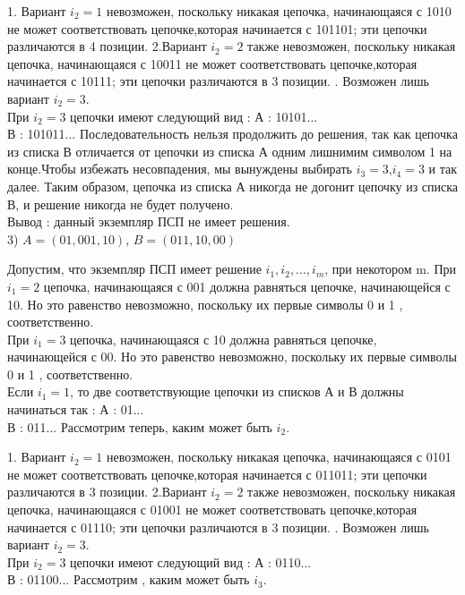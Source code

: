 \documentclass[12pt,a4paper]{article}
\begin{document}
\begin{enumerate}
	1. Вариант $i_2 = 1$ невозможен, поскольку никакая цепочка, начинающаяся с 1010 не может соответствовать цепочке,которая начинается с 101101; эти цепочки различаются в 4 позиции.
	\newline
	2.Вариант $i_2 = 2$ также невозможен, поскольку никакая цепочка, начинающаяся с 10011 не может соответствовать цепочке,которая начинается с 10111; эти цепочки различаются в 3 позиции.
	. Возможен лишь вариант $i_2 = 3$.\\
	При $i_2 = 3$ цепочки имеют следующий вид :
	\newline
	А : 10101...\\
	В : 101011...
	\newline
	Последовательность нельзя продолжить до решения, так как цепочка из списка В отличается от цепочки из списка А одним лишнимим символом 1 на конце.Чтобы избежать несовпадения, мы вынуждены выбирать $i_3 = 3$,$i_4 = 3$ и так далее. Таким образом, цепочка из списка А никогда не догонит цепочку из списка В, и решение никогда не будет получено.\\
	\newline
	Вывод : данный экземпляр ПСП не имеет решения.\\
	
	3) $A=(01,001,10)$, $B=(011,10,00)$
	
	Допустим, что экземпляр ПСП имеет решение $i_{1},i_{2},...,i_{m}$, при некотором m.
	При $i_{1} = 2$ цепочка, начинающаяся с 001 должна равняться цепочке, начинающейся с 10. Но это равенство невозможно, поскольку их первые символы 0 и 1 , соответственно.\\
	При $i_{1} = 3$ цепочка, начинающаяся с 10 должна равняться цепочке, начинающейся с 00. Но это равенство невозможно, поскольку их первые символы 0 и 1 , соответственно.\\
	Если $i_{1} = 1$, то две соответствующие цепочки из списков А и В должны начинаться так :
	\newline
	А : 01... \\
	В : 011...
	\newline
	Рассмотрим теперь, каким может быть $i_2$. 
	
	1. Вариант $i_2 = 1$ невозможен, поскольку никакая цепочка, начинающаяся с 0101 не может соответствовать цепочке,которая начинается с 011011; эти цепочки различаются в 3 позиции.
	\newline
	2.Вариант $i_2 = 2$ также невозможен, поскольку никакая цепочка, начинающаяся с 01001 не может соответствовать цепочке,которая начинается с 01110; эти цепочки различаются в 3 позиции.
	. Возможен лишь вариант $i_2 = 3$.\\
	При $i_2 = 3$ цепочки имеют следующий вид :
	\newline
	А : 0110...\\
	В : 01100...
	\newline
	Рассмотрим , каким может быть $i_3$. 
	

\end{enumerate}
\end{document}
